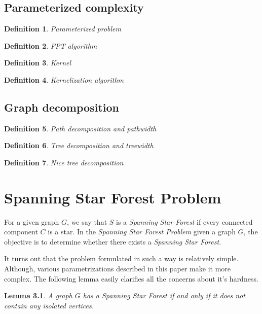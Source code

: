 \documentclass[en]{pracamgr}
\newtheorem{defi}{Definition}
\newtheorem{lemma}{Lemma}
\newcommand{\ssf}{\emph{Spanning Star Forest}}
\newcommand{\ssfp}{\emph{Spanning Star Forest Problem}}
\begin{document}
\section{Parameterized complexity}

\begin{defi}\label{Parameterized problem}
	Parameterized problem
\end{defi}

\begin{defi}\label{FPT algorithm}
	FPT algorithm
\end{defi}

\begin{defi}\label{Kernel}
	Kernel
\end{defi}

\begin{defi}\label{Kernelization algorithm}
	Kernelization algorithm
\end{defi}

\section{Graph decomposition}

\begin{defi}\label{Pathwidth}
	Path decomposition and pathwidth
\end{defi}

\begin{defi}\label{Treewidth}
	Tree decomposition and treewidth
\end{defi}

\begin{defi}\label{nice tree decomposition}
	Nice tree decomposition
\end{defi}

\chapter{Spanning Star Forest Problem}\label{r:losers}

For a given graph $G$, we say that $S$ is a \ssf{} if every connected component $C$ is a star. In the \ssfp{} given a graph $G$, the objective is to determine whether there exists a \ssf{}.

It turns out that the problem formulated in such a way is relatively simple. Although, various parametrizations described in this paper make it more complex. The following lemma easily clarifies all the concerns about it's hardness.

\begin{lemma}\label{SSF lemma}
 A graph $G$ has a \ssf{} if and only if it does not contain any isolated vertices.
\end{lemma}
\end{document}
